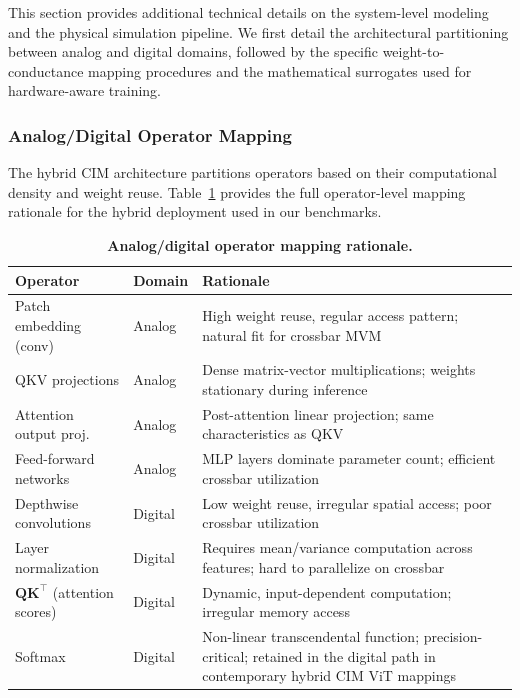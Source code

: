 This section provides additional technical details on the system-level modeling and the physical simulation pipeline. We first detail the architectural partitioning between analog and digital domains, followed by the specific weight-to-conductance mapping procedures and the mathematical surrogates used for hardware-aware training.

\subsubsection{Analog/Digital Operator Mapping}
\label{subsec:supp-operator-mapping}

The hybrid CIM architecture partitions operators based on their computational density and weight reuse. Table~\ref{tab:supp-operator-mapping} provides the full operator-level mapping rationale for the hybrid deployment used in our benchmarks.

\begin{table}[ht]
\centering
\caption{\textbf{Analog/digital operator mapping rationale.}}
\label{tab:supp-operator-mapping}
\small
\begin{tabular}{@{}ll>{\raggedright\arraybackslash}p{6.5cm}@{}}
\toprule
\textbf{Operator} & \textbf{Domain} & \textbf{Rationale} \\
\midrule
Patch embedding (conv) & Analog & High weight reuse, regular access pattern; natural fit for crossbar MVM \\
QKV projections & Analog & Dense matrix-vector multiplications; weights stationary during inference \\
Attention output proj. & Analog & Post-attention linear projection; same characteristics as QKV \\
Feed-forward networks & Analog & MLP layers dominate parameter count; efficient crossbar utilization \\
\midrule
Depthwise convolutions & Digital & Low weight reuse, irregular spatial access; poor crossbar utilization \citep{wu2023bwq} \\
Layer normalization & Digital & Requires mean/variance computation across features; hard to parallelize on crossbar \\
$\mathbf{QK}^{\top}$ (attention scores) & Digital & Dynamic, input-dependent computation; irregular memory access \citep{liu2024hardsea} \\
Softmax & Digital & Non-linear transcendental function; precision-critical; retained in the digital path in contemporary hybrid CIM ViT mappings \citep{wang2025hemlet,liu2024hardsea} \\
\bottomrule
\end{tabular}
\end{table}

